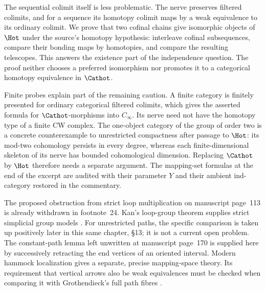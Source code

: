 The sequential colimit itself is less problematic.  The nerve preserves filtered colimits, and for a sequence its homotopy colimit maps by a weak equivalence to its ordinary colimit.  We prove that two cofinal chains give isomorphic objects of $\Hot$ under the source's homotopy hypothesis: interleave cofinal subsequences, compare their bonding maps by homotopies, and compare the resulting telescopes.  This answers the existence part of the independence question.  The proof neither chooses a preferred isomorphism nor promotes it to a categorical homotopy equivalence in $\Cathot$.

Finite probes explain part of the remaining caution.  A finite category is finitely presented for ordinary categorical filtered colimits, which gives the asserted formula for $\Cathot$-morphisms into $C_\infty$.  Its nerve need not have the homotopy type of a finite CW complex.  The one-object category of the group of order two is a concrete counterexample to unrestricted compactness after passage to $\Hot$: its mod-two cohomology persists in every degree, whereas each finite-dimensional skeleton of its nerve has bounded cohomological dimension.  Replacing $\Cathot$ by $\Hot$ therefore needs a separate argument.  The mapping-set formulas at the end of the excerpt are audited with their parameter $Y$ and their ambient ind-category restored in the commentary.

The proposed obstruction from strict loop multiplication on manuscript page~113 is already withdrawn in footnote~24.  Kan's loop-group theorem supplies strict simplicial group models \citep[Theorem~7.1]{Kan1958Combinatorial}.  For unrestricted paths, the specific comparison is taken up positively later in this same chapter, \S13; it is not a current open problem.  The constant-path lemma left unwritten at manuscript page~170 is supplied here by successively retracting the end vertices of an oriented interval.  Modern hammock localization gives a separate, precise mapping-space theory.  Its requirement that vertical arrows also be weak equivalences must be checked when comparing it with Grothendieck's full path fibres \citep{DwyerKan1980Calculating,ArakawaCnossen2026}.
\nocite{*}
